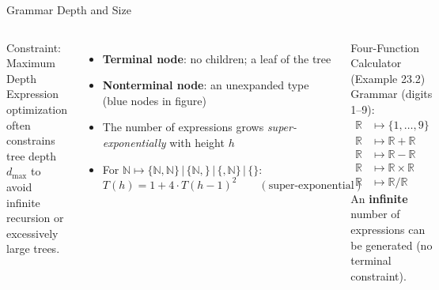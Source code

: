 \documentclass[aspectratio=169,10pt]{beamer}
\begin{document}
\begin{frame}{Grammar Depth and Size}
  \begin{columns}[T]
    \begin{block}{Constraint: Maximum Depth}
      Expression optimization often constrains tree depth $d_{\max}$ to
      avoid infinite recursion or excessively large trees.
    \end{block}
    \medskip
    \begin{itemize}
      \item \textbf{Terminal node}: no children; a leaf of the tree
      \item \textbf{Nonterminal node}: an unexpanded type (blue nodes in figure)
      \item The number of expressions grows \emph{super-exponentially} with height $h$
      \item For $\mathbb{N}\mapsto\{\mathbb{N},\mathbb{N}\}\,|\,\{\mathbb{N},\}\,|\,\{,\mathbb{N}\}\,|\,\{\}$:
        \[ T(h) = 1 + 4 \cdot T(h-1)^2 \qquad (\text{super-exponential}) \]
    \end{itemize}
    \begin{exampleblock}{Four-Function Calculator (Example 23.2)}
      \vspace{2pt}
      Grammar (digits 1--9):
      \begin{align*}
        \mathbb{R} &\mapsto \{1,\ldots,9\} \\
        \mathbb{R} &\mapsto \mathbb{R} + \mathbb{R} \\
        \mathbb{R} &\mapsto \mathbb{R} - \mathbb{R} \\
        \mathbb{R} &\mapsto \mathbb{R} \times \mathbb{R} \\
        \mathbb{R} &\mapsto \mathbb{R} / \mathbb{R}
      \end{align*}
      An \textbf{infinite} number of expressions can be generated (no terminal constraint).
    \end{exampleblock}
  \end{columns}
\end{frame}
\end{document}
